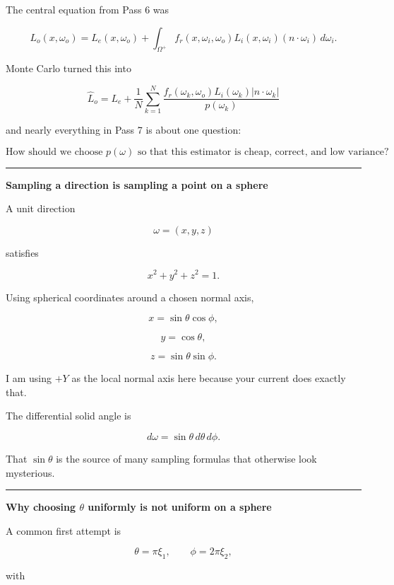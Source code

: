 The central equation from Pass 6 was

\[
L_o(x,\omega_o)
=
L_e(x,\omega_o)
+
\int_{\Omega^+}
f_r(x,\omega_i,\omega_o)
L_i(x,\omega_i)
\left(n\cdot\omega_i\right)
\,d\omega_i.
\]

Monte Carlo turned this into

\[
\boxed{
\hat L_o
=
L_e+
\frac{1}{N}
\sum_{k=1}^{N}
\frac{
f_r(\omega_k,\omega_o)
L_i(\omega_k)
|n\cdot\omega_k|
}{
p(\omega_k)
}
}
\]

and nearly everything in Pass 7 is about one question:

\[
\boxed{
\text{How should we choose }p(\omega)\text{ so that this estimator is cheap, correct, and low variance?}
}
\]

\begin{center}\rule{0.5\linewidth}{0.5pt}\end{center}

\textbf{Sampling a direction is sampling a point on a sphere}

A unit direction

\[
\omega=(x,y,z)
\]

satisfies

\[
x^2+y^2+z^2=1.
\]

Using spherical coordinates around a chosen normal axis,

\[
x=\sin\theta\cos\phi,
\]

\[
y=\cos\theta,
\]

\[
z=\sin\theta\sin\phi.
\]

I am using \(+Y\) as the local normal axis here because your current  does exactly that.

The differential solid angle is

\[
\boxed{
d\omega=\sin\theta\,d\theta\,d\phi.
}
\]

That \(\sin\theta\) is the source of many sampling formulas that otherwise look mysterious.

\begin{center}\rule{0.5\linewidth}{0.5pt}\end{center}

\textbf{Why choosing \(\theta\) uniformly is not uniform on a sphere}

A common first attempt is

\[
\theta=\pi\xi_1,
\qquad
\phi=2\pi\xi_2,
\]

with

